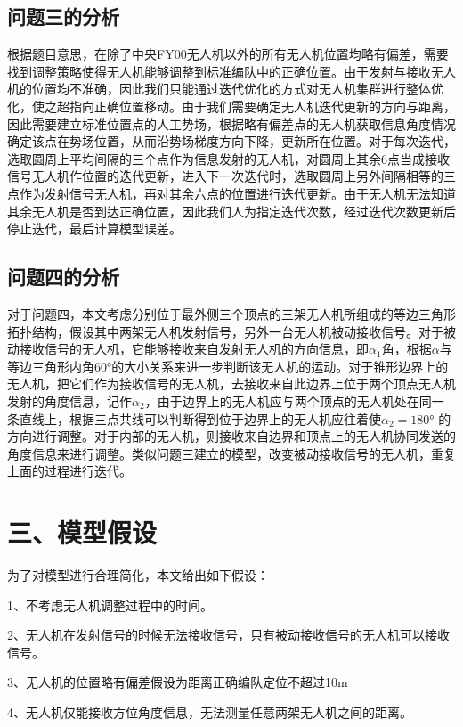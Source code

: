 \documentclass{my_paper}
\begin{document}
\subsection{问题三的分析}
根据题目意思，在除了中央FY00无人机以外的所有无人机位置均略有偏差，需要找到调整策略使得无人机能够调整到标准编队中的正确位置。由于发射与接收无人机的位置均不准确，因此我们只能通过迭代优化的方式对无人机集群进行整体优化，使之超指向正确位置移动。由于我们需要确定无人机迭代更新的方向与距离，因此需要建立标准位置点的人工势场，根据略有偏差点的无人机获取信息角度情况确定该点在势场位置，从而沿势场梯度方向下降，更新所在位置。对于每次迭代，选取圆周上平均间隔的三个点作为信息发射的无人机，对圆周上其余6点当成接收信号无人机作位置的迭代更新，进入下一次迭代时，选取圆周上另外间隔相等的三点作为发射信号无人机，再对其余六点的位置进行迭代更新。由于无人机无法知道其余无人机是否到达正确位置，因此我们人为指定迭代次数，经过迭代次数更新后停止迭代，最后计算模型误差。

\subsection{问题四的分析}

对于问题四，本文考虑分别位于最外侧三个顶点的三架无人机所组成的等边三角形拓扑结构，假设其中两架无人机发射信号，另外一台无人机被动接收信号。对于被动接收信号的无人机，它能够接收来自发射无人机的方向信息，即$\alpha_1$角，根据$\alpha$与等边三角形内角$60°$的大小关系来进一步判断该无人机的运动。对于锥形边界上的无人机，把它们作为接收信号的无人机，去接收来自此边界上位于两个顶点无人机发射的角度信息，记作$\alpha_2$，由于边界上的无人机应与两个顶点的无人机处在同一条直线上，根据三点共线可以判断得到位于边界上的无人机应往着使$\alpha_2=180°$ 的方向进行调整。对于内部的无人机，则接收来自边界和顶点上的无人机协同发送的角度信息来进行调整。类似问题三建立的模型，改变被动接收信号的无人机，重复上面的过程进行迭代。

\section{三、模型假设}
为了对模型进行合理简化，本文给出如下假设：

1、不考虑无人机调整过程中的时间。

2、无人机在发射信号的时候无法接收信号，只有被动接收信号的无人机可以接收信号。

3、无人机的位置略有偏差假设为距离正确编队定位不超过10m

4、无人机仅能接收方位角度信息，无法测量任意两架无人机之间的距离。
\end{document}
